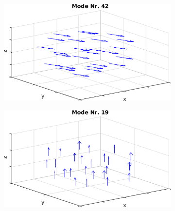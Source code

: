 \documentclass[numbers=noenddot,a4paper,notitlepage,twoside,BCOR15mm]{scrbook}
\begin{document}
					\begin{figure}[!t]
						\centering
						\begin{subfigure}[t]{0.325\textwidth}
							\centering
							\includegraphics[width=\textwidth,height=0.8\textwidth]{figs/auswertung/manipulation/erstensungestModeNr42.png}
						\end{subfigure}
						\begin{subfigure}[t]{0.325\textwidth}
							\centering
							\includegraphics[width=\textwidth,height=0.8\textwidth]{figs/auswertung/manipulation/erstensungestModeNr19.png}
						\end{subfigure}

\end{figure}
\end{document}
